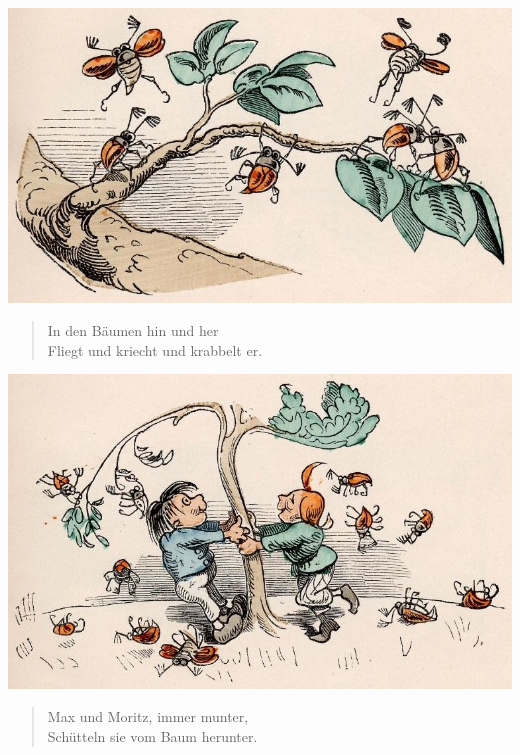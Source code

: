 \documentclass[a4paper,12pt]{article}
\begin{document}
\begin{center}\includegraphics[scale=.7, alt={Maikäfer}]{images/5-01.jpg}\end{center}



\begin{verse}
In den Bäumen hin und her\\{}
Fliegt und kriecht und krabbelt er.
\end{verse}



\begin{center}\includegraphics[scale=.7, alt={... schütteln}]{images/5-02.jpg}\end{center}



\begin{verse}
Max und Moritz, immer munter,\\{}
Schütteln sie vom Baum herunter.
\end{verse}
\end{document}

